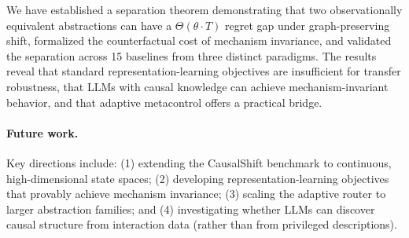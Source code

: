 \documentclass[runningheads]{llncs}
\begin{document}
We have established a separation theorem demonstrating that two observationally equivalent abstractions can have a $\Theta(\theta \cdot T)$ regret gap under graph-preserving shift, formalized the counterfactual cost of mechanism invariance, and validated the separation across 15 baselines from three distinct paradigms. The results reveal that standard representation-learning objectives are insufficient for transfer robustness, that LLMs with causal knowledge can achieve mechanism-invariant behavior, and that adaptive metacontrol offers a practical bridge.

\paragraph{Future work.} Key directions include: (1) extending the CausalShift benchmark to continuous, high-dimensional state spaces; (2) developing representation-learning objectives that provably achieve mechanism invariance; (3) scaling the adaptive router to larger abstraction families; and (4) investigating whether LLMs can discover causal structure from interaction data (rather than from privileged descriptions).
\end{document}
